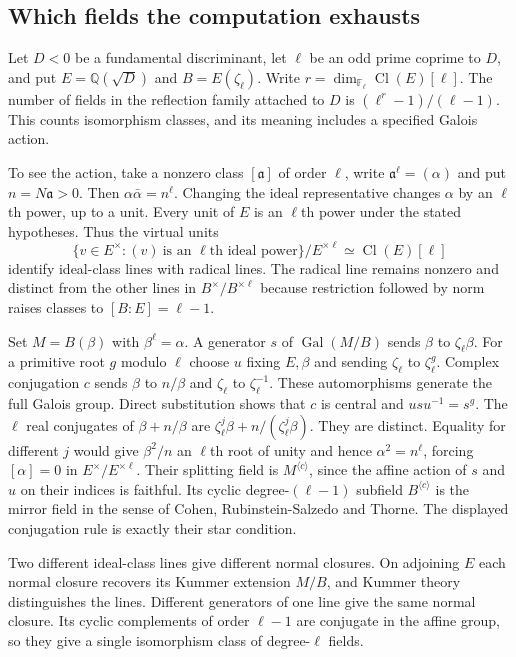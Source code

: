 \subsection*{Which fields the computation exhausts}

Let $D<0$ be a fundamental discriminant, let $\ell$ be an odd prime
coprime to $D$, and put $E=\mathbb Q(\sqrt D)$ and $B=E(\zeta_\ell)$.
Write $r=\dim_{\mathbb F_\ell}\operatorname{Cl}(E)[\ell]$.
The number of fields in the reflection family attached to $D$ is
$(\ell^r-1)/(\ell-1)$. This counts isomorphism classes, and its
meaning includes a specified Galois action.

To see the action, take a nonzero class $[\mathfrak a]$ of order
$\ell$, write $\mathfrak a^\ell=(\alpha)$ and put
$n=N\mathfrak a>0$. Then $\alpha\bar\alpha=n^\ell$.
Changing the ideal representative changes $\alpha$ by an $\ell$th
power, up to a unit. Every unit of $E$ is an $\ell$th power under the
stated hypotheses. Thus the virtual units
\[
 \{v\in E^\times:(v)\ \text{is an }\ell\text{th ideal power}\}/E^{\times\ell}
 \simeq \operatorname{Cl}(E)[\ell]
\]
identify ideal-class lines with radical lines. The radical line remains
nonzero and distinct from the other lines in $B^\times/B^{\times\ell}$
because restriction followed by norm raises classes to $[B:E]=\ell-1$.

Set $M=B(\beta)$ with $\beta^\ell=\alpha$. A generator $s$ of
$\operatorname{Gal}(M/B)$ sends $\beta$ to $\zeta_\ell\beta$.
For a primitive root $g$ modulo $\ell$ choose $u$ fixing $E,\beta$
and sending $\zeta_\ell$ to $\zeta_\ell^g$. Complex conjugation $c$
sends $\beta$ to $n/\beta$ and $\zeta_\ell$ to $\zeta_\ell^{-1}$.
These automorphisms generate the full Galois group. Direct substitution
shows that $c$ is central and $usu^{-1}=s^g$.
The $\ell$ real conjugates of $\beta+n/\beta$ are
$\zeta_\ell^j\beta+n/(\zeta_\ell^j\beta)$.
They are distinct. Equality for different $j$ would give
$\beta^2/n$ an $\ell$th root of unity and hence $\alpha^2=n^\ell$,
forcing $[\alpha]=0$ in $E^\times/E^{\times\ell}$.
Their splitting field is $M^{\langle c\rangle}$,
since the affine action of $s$ and $u$ on their indices is faithful.
Its cyclic degree-$(\ell-1)$ subfield $B^{\langle c\rangle}$ is the
mirror field in the sense of Cohen, Rubinstein-Salzedo and Thorne.
The displayed conjugation rule is exactly their star condition.

Two different ideal-class lines give different normal closures.
On adjoining $E$ each normal closure recovers its Kummer extension
$M/B$, and Kummer theory distinguishes the lines. Different generators
of one line give the same normal closure. Its cyclic complements of
order $\ell-1$ are conjugate in the affine group, so they give a single
isomorphism class of degree-$\ell$ fields.

